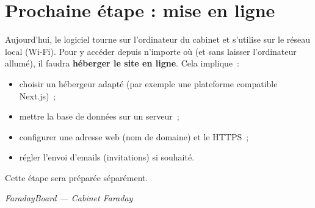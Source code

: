 \documentclass[11pt,a4paper]{article}
\begin{document}
\section{Prochaine étape : mise en ligne}
Aujourd'hui, le logiciel tourne sur l'ordinateur du cabinet et s'utilise sur le réseau local (Wi-Fi). Pour y accéder depuis n'importe où (et sans laisser l'ordinateur allumé), il faudra \textbf{héberger le site en ligne}. Cela implique~:
\begin{itemize}[leftmargin=1.4em]
  \item choisir un hébergeur adapté (par exemple une plateforme compatible Next.js)~;
  \item mettre la base de données sur un serveur~;
  \item configurer une adresse web (nom de domaine) et le HTTPS~;
  \item régler l'envoi d'emails (invitations) si souhaité.
\end{itemize}
Cette étape sera préparée séparément.

\vfill
\begin{center}
\textcolor{ardoise}{\itshape FaradayBoard — Cabinet Faraday}
\end{center}
\end{document}
